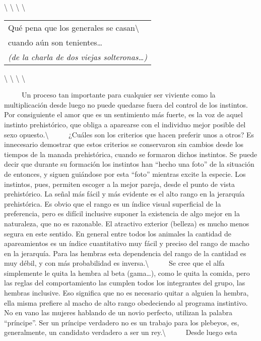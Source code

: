 \textbackslash{} \textbackslash{} \textbackslash{} \textbackslash{}

\begin{longtable}[]{@{}l@{}}
\toprule
Qué pena que los generales se casan\textbackslash{}\tabularnewline
cuando aún son tenientes\ldots{}\tabularnewline
\emph{(de la charla de dos viejas solteronas\ldots{})}\tabularnewline
\bottomrule
\end{longtable}

\textbackslash{} \textbackslash{} \textbackslash{} \textbackslash{}

~ ~ ~ Un proceso tan importante para cualquier ser viviente como la
multiplicación desde luego no puede quedarse fuera del control de los
instintos. Por consiguiente el amor que es un sentimiento más fuerte, es
la voz de aquel instinto prehistórico, que obliga a aparearse con el
individuo mejor posible del sexo opuesto.\textbackslash{} ~ ~ ~ ¿Cuáles
son los criterios que hacen preferir unos a otros? Es innecesario
demostrar que estos criterios se conservaron sin cambios desde los
tiempos de la manada prehistórica, cuando se formaron dichos instintos.
Se puede decir que durante su formación los instintos han ``hecho una
foto'' de la situación de entonces, y siguen guiándose por esta ``foto''
mientras excite la especie. Los instintos, pues, permiten escoger a la
mejor pareja, desde el punto de vista prehistórico. La señal más fácil y
más evidente es el alto rango en la jerarquía prehistórica. Es obvio que
el rango es un índice visual superficial de la preferencia, pero es
difícil inclusive suponer la existencia de algo mejor en la naturaleza,
que no es razonable. El atractivo exterior (belleza) es mucho menos
segura en este sentido. En general entre todos los animales la cantidad
de apareamientos es un índice cuantitativo muy fácil y preciso del rango
de macho en la jerarquía. Para las hembras esta dependencia del rango de
la cantidad es muy débil, y con más probabilidad es
inversa.\textbackslash{} ~ ~ ~ Se cree que el alfa simplemente le quita
la hembra al beta (gama\ldots{}), como le quita la comida, pero las
reglas del comportamiento las cumplen todos los integrantes del grupo,
las hembras inclusive. Eso significa que no es necesario quitar a
alguien la hembra, ella misma prefiere al macho de alto rango
obedeciendo al programa instintivo. No en vano las mujeres hablando de
un novio perfecto, utilizan la palabra ``príncipe''. Ser un príncipe
verdadero no es un trabajo para los plebeyos, es, generalmente, un
candidato verdadero a ser un rey.\textbackslash{} ~ ~ ~ Desde luego esta
